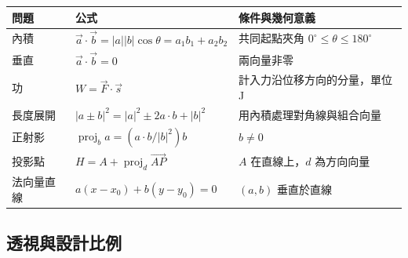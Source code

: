 \documentclass[11pt,a4paper]{article}
\newcounter{none}
\begin{document}
{\def\LTcaptype{none} %
\begin{longtable}[]{@{}
  >{\raggedright\arraybackslash}p{}
  >{\raggedright\arraybackslash}p{}
  >{\raggedright\arraybackslash}p{}@{}}
\toprule\noalign{}
\begin{minipage}[b]{\linewidth}\raggedright
問題
\end{minipage} & \begin{minipage}[b]{\linewidth}\raggedright
公式
\end{minipage} & \begin{minipage}[b]{\linewidth}\raggedright
條件與幾何意義
\end{minipage} \\
\midrule\noalign{}
\endhead
\bottomrule\noalign{}
\endlastfoot
內積 & \(\vec a\cdot\vec b=|a||b|\cos\theta=a_1b_1+a_2b_2\) & 共同起點夾角 \(0^\circ\le\theta\le180^\circ\) \\
垂直 & \(\vec a\cdot\vec b=0\) & 兩向量非零 \\
功 & \(W=\vec F\cdot\vec s\) & 計入力沿位移方向的分量，單位 J \\
長度展開 & \(|a\pm b|^2=|a|^2\pm2a\cdot b+|b|^2\) & 用內積處理對角線與組合向量 \\
正射影 & \(\operatorname{proj}_{b}a=(a\cdot b/|b|^2)b\) & \(b\ne0\) \\
投影點 & \(H=A+\operatorname{proj}_{d}\overrightarrow{AP}\) & \(A\) 在直線上，\(d\) 為方向向量 \\
法向量直線 & \(a(x-x_0)+b(y-y_0)=0\) & \((a,b)\) 垂直於直線 \\
\end{longtable}
}

\subsection{透視與設計比例}\label{ux900fux8996ux8207ux8a2dux8a08ux6bd4ux4f8b}
\end{document}
